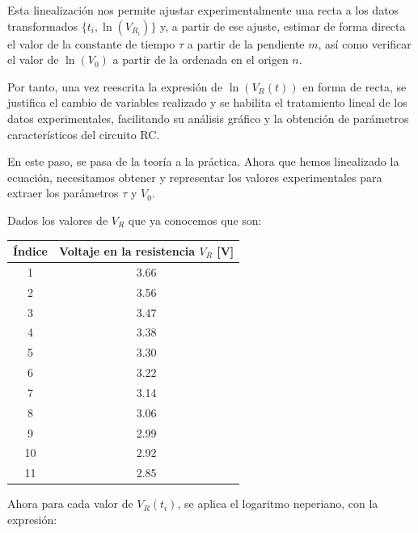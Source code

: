 \documentclass{article}
\begin{document}
Esta linealización nos permite ajustar experimentalmente una recta a los datos transformados \( \{t_i, \ln(V_{R_i})\} \) y, a partir de ese ajuste, estimar de forma directa el valor de la constante de tiempo \( \tau \) a partir de la pendiente \( m \), así como verificar el valor de \( \ln(V_0) \) a partir de la ordenada en el origen \( n \).

\vspace{0.3cm}

Por tanto, una vez reescrita la expresión de \( \ln(V_R(t)) \) en forma de recta, se justifica el cambio de variables realizado y se habilita el tratamiento lineal de los datos experimentales, facilitando su análisis gráfico y la obtención de parámetros característicos del circuito RC.

\vspace{2em}
En este paso, se pasa de la teoría a la práctica. Ahora que hemos linealizado la ecuación, necesitamos obtener y representar los valores experimentales para extraer los parámetros \( \tau \) y \( V_0 \).

\vspace{2em}
Dados los valores de $V_R$ que ya conocemos que son:

\begin{center}
	
	\begin{table}[H]
		\centering
		\begin{tabular}{|c|c|}
			\hline
			\textbf{Índice} & \textbf{Voltaje en la resistencia $V_R$ [V]} \\
			\hline
			1  & 3.66 \\
			2  & 3.56 \\
			3  & 3.47 \\
			4  & 3.38 \\
			5  & 3.30 \\
			6  & 3.22 \\
			7  & 3.14 \\
			8  & 3.06 \\
			9  & 2.99 \\
			10 & 2.92 \\
			11 & 2.85 \\
			\hline
		\end{tabular}

	\end{table}
	
\end{center}



Ahora para cada valor de \( V_R(t_i) \), se aplica el logaritmo neperiano, con la expresión:
\end{document}
